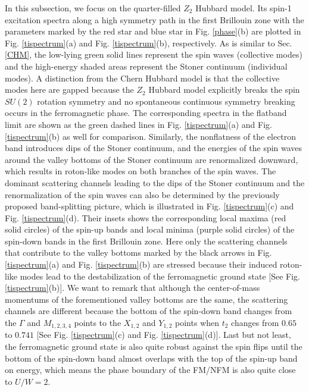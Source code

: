 \documentclass[amsmath,superscriptaddress,showpacs,aps,prb,twocolumn]{revtex4-1}
\begin{document}
\par In this subsection, we focus on the quarter-filled $Z_2$ Hubbard model. Its spin-1 excitation spectra along a high symmetry path in the first Brillouin zone with the parameters marked by the red star and blue star in Fig. \ref{phase}(b) are plotted in Fig. \ref{tispectrum}(a) and Fig. \ref{tispectrum}(b), respectively. As is similar to Sec. \ref{CHM}, the low-lying green solid lines represent the spin waves (collective modes) and the high-energy shaded areas represent the Stoner continuum (individual modes). A distinction from the Chern Hubbard model is that the collective modes here are gapped because the $Z_2$ Hubbard model explicitly breaks the spin $SU(2)$ rotation symmetry and no spontaneous continuous symmetry breaking occurs in the ferromagnetic phase. The corresponding spectra in the flatband limit are shown as the green dashed lines in Fig. \ref{tispectrum}(a) and Fig. \ref{tispectrum}(b) as well for comparison. Similarly, the nonflatness of the electron band introduces dips of the Stoner continuum, and the energies of the spin waves around the valley bottoms of the Stoner continuum are renormalized downward, which results in roton-like modes on both branches of the spin waves. The dominant scattering channels leading to the dips of the Stoner continuum and the renormalization of the spin waves can also be determined by the previously proposed band-splitting picture, which is illustrated in Fig. \ref{tispectrum}(c) and Fig. \ref{tispectrum}(d). Their insets shows the corresponding local maxima (red solid circles) of the spin-up bands and local minima (purple solid circles) of the spin-down bands in the first Brillouin zone. Here only the scattering channels that contribute to the valley bottoms marked by the black arrows in Fig. \ref{tispectrum}(a) and Fig. \ref{tispectrum}(b) are stressed because their induced roton-like modes lead to the destabilization of the ferromagnetic ground state [See Fig. \ref{tispectrum}(b)]. We want to remark that although the center-of-mass momentums of the forementioned valley bottoms are the same, the scattering channels are different because the bottom of the spin-down band changes from the $\Gamma$ and $M_{1,2,3,4}$ points to the $X_{1,2}$ and $Y_{1,2}$ points when $t_2$ changes from $0.65$ to $0.741$ [See Fig. \ref{tispectrum}(c) and Fig. \ref{tispectrum}(d)]. Last but not least, the ferromagnetic ground state is also quite robust against the spin flips until the bottom of the spin-down band almost overlaps with the top of the spin-up band on energy, which means the phase boundary of the FM/NFM is also quite close to $U/W=2$.
\end{document}
